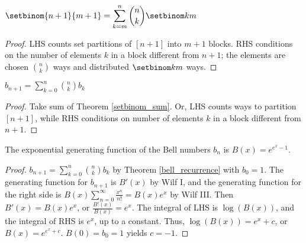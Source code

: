 \documentclass[a4paper]{article}
\begin{document}
\begin{theorem}\label{setbinom_sum}
$\setbinom{n+1}{m+1}=\displaystyle\sum_{k=m}^n\binom nk\setbinom km$

\begin{hl}
\begin{proof}
LHS counts set partitions of $[n+1]$ into $m+1$ blocks. RHS conditions on the number of elements $k$ in a block different from $n+1$; the elements are chosen $\binom nk$ ways and distributed $\setbinom km$ ways.
\end{proof}
\end{hl}
\end{theorem}

\begin{theorem}\label{bell_recurrence}
$\displaystyle b_{n+1}=\sum_{k=0}^n\binom nkb_k$

\begin{hl}
\begin{proof}
Take sum of Theorem \ref{setbinom_sum}. Or, LHS counts ways to partition $[n+1]$, while RHS conditions on number of elements $k$ in a block different from $n+1$.
\end{proof}
\end{hl}
\end{theorem}

\begin{proposition}
The exponential generating function of the Bell numbers $b_n$ is $B(x)=e^{e^x-1}$.

\begin{hl}
\begin{proof}
$b_{n+1}=\sum_{k=0}^n\binom nk b_k$ by Theorem \ref{bell_recurrence} with $b_0=1$. The generating function for $b_{n+1}$ is $B'(x)$ by Wilf I, and the generating function for the right side is $B(x)\sum_{n=0}^\infty\frac{x^n}{n!}=B(x)e^x$ by Wilf III. Then $B'(x)=B(x)e^x$, or $\frac{B'(x)}{B(x)}=e^x$. The integral of LHS is $\log(B(x))$, and the integral of RHS is $e^x$, up to a constant. Thus, $\log(B(x))=e^x+c$, or $B(x)=e^{e^x+c}$. $B(0)=b_0=1$ yields $c=-1$.
\end{proof}
\end{hl}
\end{proposition}
\end{document}

